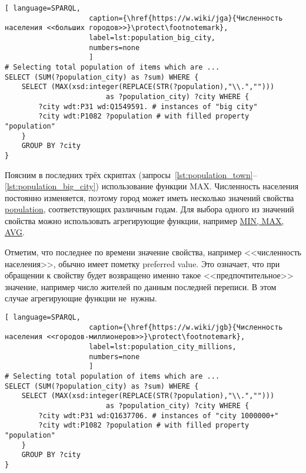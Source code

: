 \begin{lstlisting}[ language=SPARQL, 
                    caption={\href{https://w.wiki/jga}{Численность населения <<больших городов>>}\protect\footnotemark},
                    label=lst:population_big_city,
                    numbers=none
                    ]
# Selecting total population of items which are ...
SELECT (SUM(?population_city) as ?sum) WHERE {                    
	SELECT (MAX(xsd:integer(REPLACE(STR(?population),"\\.",""))) 
						as ?population_city) ?city WHERE {
		?city wdt:P31 wd:Q1549591. # instances of "big city"
		?city wdt:P1082 ?population # with filled property "population"
	}
	GROUP BY ?city
}
\end{lstlisting}



\newpage
Поясним в последних трёх скриптах 
(запросы~\ref{lst:population_town}--\ref{lst:population_big_city}) 
использование функции MAX. 
Численность населения постоянно изменяется, 
поэтому город может иметь несколько значений 
свойства \href{https://www.wikidata.org/wiki/Property:P1082}{population}, 
соответствующих различным годам. Для выбора одного из значений свойства можно использовать агрегирующие функции, 
например \href{https://en.wikibooks.org/wiki/SPARQL/Expressions\_and\_Functions\#COUNT,\_MIN,\_MAX,\_AVG\_and\_SUM}{MIN, MAX, AVG}. 

Отметим, что последнее по времени значение свойства, например <<численность населения>>, обычно имеет пометку preferred value. 
Это означает, что при обращении к свойству будет возвращено именно такое <<предпочтительное>> значение, 
например число жителей по данным последней переписи. 
В этом случае агрегирующие функции не~нужны. 

\begin{lstlisting}[ language=SPARQL, 
                    caption={\href{https://w.wiki/jgb}{Численность населения <<городов-миллионеров>>}\protect\footnotemark},
                    label=lst:population_city_millions,
                    numbers=none
                    ]
# Selecting total population of items which are ...
SELECT (SUM(?population_city) as ?sum) WHERE {
	SELECT (MAX(xsd:integer(REPLACE(STR(?population),"\\.",""))) 
						as ?population_city) ?city WHERE {
		?city wdt:P31 wd:Q1637706. # instances of "city 1000000+"
		?city wdt:P1082 ?population # with filled property "population"
	}
	GROUP BY ?city
}
\end{lstlisting}


